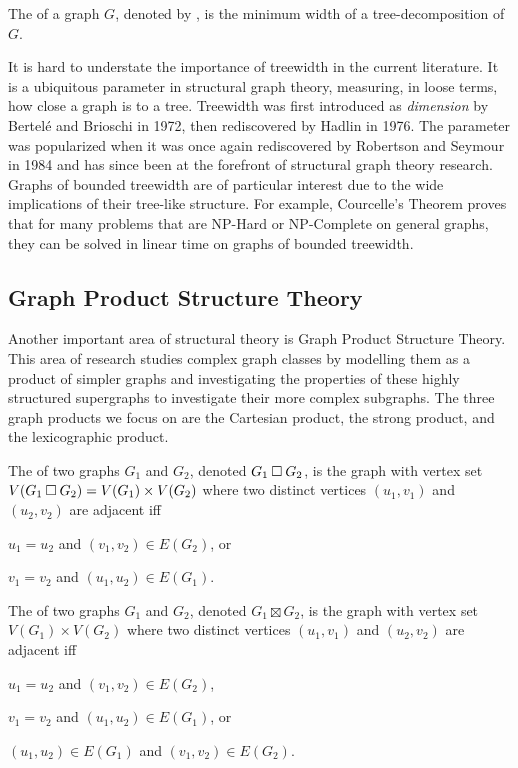 \documentclass[../main.tex]{subfiles}
\begin{document}
The  of a graph $G$, denoted by , is the minimum width of a tree-decomposition of $G$.

It is hard to understate the importance of treewidth in the current literature.
It is a ubiquitous parameter in structural graph theory, measuring, in loose terms, how close a graph is to a tree. 
Treewidth was first introduced as \textit{dimension} by  Bertel\'e  and Brioschi\cite[pp.~37--38]{BB1972} in 1972, then rediscovered by Hadlin\cite{Halin76} in 1976.
The parameter was popularized when it was once again rediscovered by Robertson and Seymour\cite{ROBERTSON198449} in 1984 and has since been at the forefront of structural graph theory research. Graphs of bounded treewidth are of particular interest due to the wide implications of their tree-like structure. For example, Courcelle's Theorem\cite{Courcelle90} proves that for many problems that are NP-Hard or NP-Complete on general graphs, they can be solved in linear time on graphs of bounded treewidth.

\subsection{Graph Product Structure Theory}
Another important area of structural theory is Graph Product Structure Theory. This area of research studies complex graph classes by modelling them as a product of simpler graphs and investigating the properties of these highly structured supergraphs to investigate their more complex subgraphs. The three graph products we focus on are the Cartesian product, the strong product, and the lexicographic product.

The  of two graphs $G_1$ and $G_2$, denoted $G_1 \mathbin{\Box} G_2$, is the graph with vertex set $V(G_1 \mathbin{\Box} G_2) = V(G_1) \times V(G_2)$ where two distinct vertices $(u_1, v_1)$ and $(u_2, v_2)$ are adjacent iff 
\begin{compactitem}
	\item $u_1 = u_2$ and $(v_1, v_2) \in E(G_2)$, or
	\item $v_1 = v_2$ and $(u_1, u_2) \in E(G_1)$.
\end{compactitem}

The  of two graphs $G_1$ and $G_2$, denoted $G_1 \boxtimes G_2$, is the graph with vertex set $V(G_1) \times V(G_2)$ where two distinct vertices $(u_1, v_1)$ and $(u_2, v_2)$ are adjacent iff 
\begin{compactitem}
	\item $u_1 = u_2$ and $(v_1, v_2) \in E(G_2)$, 
	\item $v_1 = v_2$ and $(u_1, u_2) \in E(G_1)$, or
	\item $(u_1, u_2) \in E(G_1)$ and $(v_1, v_2) \in E(G_2)$.
\end{compactitem}
\end{document}
